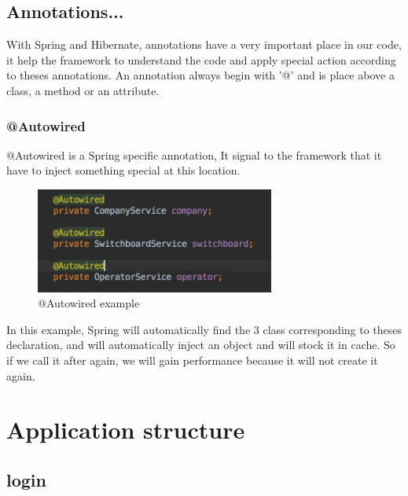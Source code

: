 \subsection{Annotations...}

With Spring and Hibernate, annotations have a very important place in our code, it help the framework to understand the code and apply special action according to theses annotations.
An annotation always begin with '@' and is place above a class, a method or an attribute.

\subsubsection{@Autowired}
@Autowired is a Spring specific annotation, It signal to the framework that it have to inject something special at this location.

\begin{figure}[!ht]
  \caption{@Autowired example}
  \centering
    \includegraphics[width=0.7\textwidth]{img/autowired.png}
\end{figure}

In this example, Spring will automatically find the 3 class corresponding to theses declaration, and will automatically inject an object and will stock it in cache. So if we call it after again, we will gain performance because it will not create it again.



\section{Application structure}

\subsection{login}

